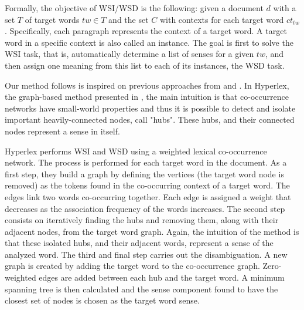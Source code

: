 Formally, the objective of WSI/WSD is the following: given a document $d$ with a set $T$ of  target words $tw \in T$ and the set $C$ with contexts for each target word $ct_{tw}$. 
Specifically, each paragraph represents the context  of a target word. A target word in a specific context is also called an instance.
The goal is first to solve the WSI task, that is, automatically determine a list of senses for a given $tw$, and then assign one meaning from this list to each of its instances, the WSD task.
%


Our method follows is inspired on previous approaches from \cite{2004.Veronis} and \cite{2007.Klapaftis.UOY}. In Hyperlex,  the graph-based  method presented  in \cite{2004.Veronis}, the main intuition is that co-occurrence networks have small-world properties and thus it is possible to detect and isolate important heavily-connected nodes, call "hubs". These hubs, and their connected nodes represent a sense in itself. 

Hyperlex performs WSI and WSD using a weighted lexical co-occurrence network. The process is performed for each target word in the document. As a first step, they build a  graph by defining the vertices (the target word node is removed) as the tokens found in the  co-occurring  context of a target word. The edges link two words co-occurring together. Each edge is assigned a weight that decreases as the association frequency of the words increases. The second step consists on iteratively finding the hubs and removing them, along with their adjacent nodes, from the target word graph. Again, the intuition of the method is that these isolated hubs, and their adjacent words, represent a sense of the analyzed word. The third and final step carries out the disambiguation. A new graph is created by adding the target word to the co-occurrence graph. Zero-weighted edges are added between each hub and the target word. A minimum spanning tree is then calculated and the sense component found to have the closest set of nodes is chosen as the target word sense.

